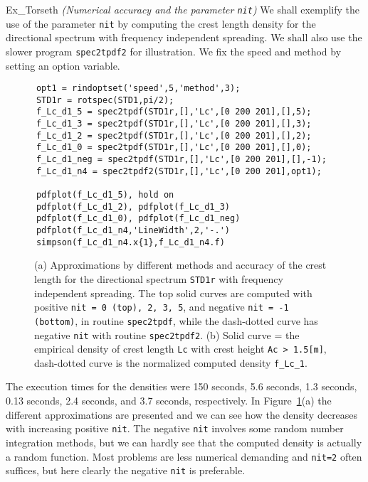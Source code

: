 \begin{cex}{Ex_Torseth} {\sl (Numerical accuracy and the parameter {\tt nit})} 
We shall exemplify the use of the parameter {\tt nit} by computing the
crest length density for the directional spectrum with frequency
independent spreading.
We shall also use the slower program {\tt spec2tpdf2} for
illustration. We fix the speed and method by setting an option variable.
{\small\begin{verbatim}
      opt1 = rindoptset('speed',5,'method',3);
      STD1r = rotspec(STD1,pi/2);
      f_Lc_d1_5 = spec2tpdf(STD1r,[],'Lc',[0 200 201],[],5);
      f_Lc_d1_3 = spec2tpdf(STD1r,[],'Lc',[0 200 201],[],3);
      f_Lc_d1_2 = spec2tpdf(STD1r,[],'Lc',[0 200 201],[],2);
      f_Lc_d1_0 = spec2tpdf(STD1r,[],'Lc',[0 200 201],[],0);
      f_Lc_d1_neg = spec2tpdf(STD1r,[],'Lc',[0 200 201],[],-1);
      f_Lc_d1_n4 = spec2tpdf2(STD1r,[],'Lc',[0 200 201],opt1);

      pdfplot(f_Lc_d1_5), hold on
      pdfplot(f_Lc_d1_2), pdfplot(f_Lc_d1_3)
      pdfplot(f_Lc_d1_0), pdfplot(f_Lc_d1_neg)
      pdfplot(f_Lc_d1_n4,'LineWidth',2,'-.')
      simpson(f_Lc_d1_n4.x{1},f_Lc_d1_n4.f)
\end{verbatim}}

\begin{figure}[tbh]
%
\hfill
{}
\vspace{-3mm}
  \caption[Comparison of crest length densities]{
(a) Approximations by different methods and accuracy
of the crest length for the directional
spectrum {\tt STD1r}  with frequency independent spreading.
The top solid curves are computed with
positive {\tt nit = 0 (top), 2, 3, 5}, and negative
{\tt nit = -1 (bottom)}, in routine {\tt spec2tpdf},
while the dash-dotted curve has negative
{\tt nit} with routine {\tt spec2tpdf2}.
(b) Solid curve = the empirical density of crest
length {\tt Lc} with crest height {\tt Ac > 1.5[m]},
dash-dotted curve is the
normalized computed density {\tt f\_Lc\_1}.
}
\label{fig72}
\end{figure}

The execution times for the densities were 150 seconds, 5.6 seconds, 1.3 seconds,
0.13 seconds, 2.4 seconds, and 3.7 seconds, respectively.
In Figure~\ref{fig72}(a) the different approximations are presented
and we can see how the density decreases with increasing positive {\tt nit}.
The negative {\tt nit} involves some random number integration methods,
but we can hardly see that the computed density is actually a random
function. Most problems are less numerical demanding and {\tt nit=2}
often suffices, but here clearly the negative {\tt nit} is preferable.


\end{cex}
